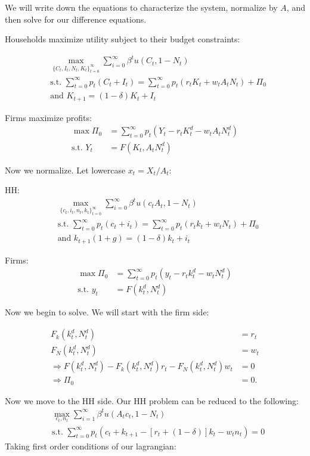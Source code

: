 \documentclass[11pt]{article} %
\begin{document}
We will write down the equations to characterize the system, normalize by $A$, and then solve for our difference equations. 

Households maximize utility subject to their budget constraints:

\begin{align*}
&\max_{\{C_t,I_t,N_t,K_t\}_{t=0}^{\infty}} \sum_{i=0}^{\infty}\beta^t u(C_t,1-N_t)\\
&\text{s.t. } \sum_{t=0}^{\infty} p_t (C_t + I_t) =  \sum_{t=0}^{\infty} p_t(r_tK_t + w_tA_tN_t) + \Pi_0\\
&\text{and } K_{t+1} = (1-\delta) K_t+ I_t
\end{align*}

Firms maximize profits:
\begin{align*}
\max \Pi_0 &=\sum_{t=0}^{\infty}p_t(Y_t -r_tK_t^d - w_t A_tN_t^d)\\
\text{s.t. } Y_t &= F(K_t,A_tN_t^d)
\end{align*}

Now we normalize. Let lowercase $x_t = X_t/A_t$:

HH:
\begin{align*}
&\max_{\{c_t,i_t,n_t,k_t\}_{t=0}^{\infty}} \sum_{i=0}^{\infty}\beta^t u(c_tA_t,1-N_t)\\
&\text{s.t. } \sum_{t=0}^{\infty} p_t (c_t + i_t) =  \sum_{t=0}^{\infty} p_t(r_tk_t + w_tN_t) + \Pi_0\\
&\text{and } k_{t+1}(1+g) = (1-\delta) k_t+ i_t
\end{align*}

Firms:
\begin{align*}
\max \Pi_0 &=\sum_{t=0}^{\infty}p_t(y_t -r_tk_t^d - w_t N_t^d)\\
\text{s.t. } y_t &= F(k_t^d,N_t^d)
\end{align*}

Now we begin to solve. We will start with the firm side:

\begin{align*}
F_k(k_t^d,N_t^d) &= r_t\\
F_N(k_t^d,N_t^d) &= w_t\\
\Rightarrow F(k_t^d,N_t^d) - F_k(k_t^d,N_t^d) r_t - F_N(k_t^d,N_t^d) w_t &= 0 \\\Rightarrow \Pi_0 &= 0.
\end{align*}

Now we move to the HH side. Our HH problem can be reduced to the following:
\begin{align*}
&\max_{c_t,n_t} \sum_{i=1}^{\infty}\beta^t u(A_tc_t,1-N_t)\\
&\text{s.t. } \sum_{t=0}^{\infty} p_t ( c_t + k_{t+1} - [r_t + (1-\delta)]k_t - w_tn_t ) = 0
\end{align*}
Taking first order conditions of our lagrangian:
\end{document}
